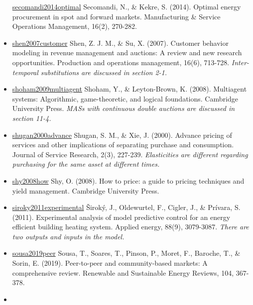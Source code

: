 \documentclass[letterpaper,8pt,twocolumn,twoside,]{pinp}
\begin{document}
\begin{itemize}
  \href{https://pubsonline.informs.org/doi/10.1287/msom.2013.0473}{secomandi2014optimal}
  Secomandi, N., \& Kekre, S. (2014). Optimal energy procurement in spot
  and forward markets. Manufacturing \& Service Operations Management,
  16(2), 270-282.
\item
  \href{https://onlinelibrary.wiley.com/doi/abs/10.1111/j.1937-5956.2007.tb00291.x}{shen2007customer}
  Shen, Z. J. M., \& Su, X. (2007). Customer behavior modeling in
  revenue management and auctions: A review and new research
  opportunities. Production and operations management, 16(6), 713-728.
  \emph{Inter-temporal substitutions are discussed in section 2-1.}
\item
  \href{https://www.cambridge.org/core/books/multiagent-systems/B11B69E0CB9032D6EC0A254F59922360}{shoham2009multiagent}
  Shoham, Y., \& Leyton-Brown, K. (2008). Multiagent systems:
  Algorithmic, game-theoretic, and logical foundations. Cambridge
  University Press. \emph{MASs with continuous double auctions are
  discussed in section 11-4.}
\item
  \href{https://journals.sagepub.com/doi/abs/10.1177/109467050023001?casa_token=nHdK2gtk0ZUAAAAA:JZm0jvC2O9C0qr7WPZZphEZINBT2hpYCLNSB5hykwAO1buCHLim0JzlleOeUOwCv0uIZWbmfE8vI}{shugan2000advance}
  Shugan, S. M., \& Xie, J. (2000). Advance pricing of services and
  other implications of separating purchase and consumption. Journal of
  Service Research, 2(3), 227-239. \emph{Elasticities are different
  regarding purchasing for the same asset at different times.}
\item
  \href{https://www.cambridge.org/core/books/how-to-price/27B182881BC668B688F8DA949DF52554}{shy2008how}
  Shy, O. (2008). How to price: a guide to pricing techniques and yield
  management. Cambridge University Press.
\item
  \href{https://www.sciencedirect.com/science/article/pii/S0306261911001668}{siroky2011experimental}
  Široký, J., Oldewurtel, F., Cigler, J., \& Prívara, S. (2011).
  Experimental analysis of model predictive control for an energy
  efficient building heating system. Applied energy, 88(9), 3079-3087.
  \emph{There are two outputs and inputs in the model.}
\item
  \href{https://www.sciencedirect.com/science/article/pii/S1364032119300462}{sousa2019peer}
  Sousa, T., Soares, T., Pinson, P., Moret, F., Baroche, T., \& Sorin,
  E. (2019). Peer-to-peer and community-based markets: A comprehensive
  review. Renewable and Sustainable Energy Reviews, 104, 367-378.
\item

\end{itemize}
\end{document}
